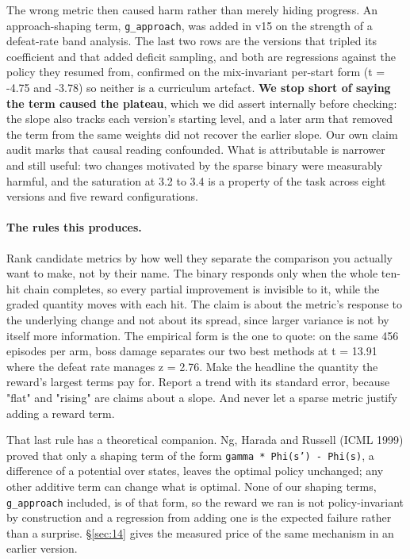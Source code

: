 \documentclass[11pt]{article}
\begin{document}
The wrong metric then caused harm rather than merely hiding progress. An approach-shaping term, \texttt{g\_approach}, was added in v15 on the strength of a defeat-rate band analysis. The last two rows are the versions that tripled its coefficient and that added deficit sampling, and both are regressions against the policy they resumed from, confirmed on the mix-invariant per-start form (t = -4.75 and -3.78) so neither is a curriculum artefact. \textbf{We stop short of saying the term caused the plateau}, which we did assert internally before checking: the slope also tracks each version's starting level, and a later arm that removed the term from the same weights did not recover the earlier slope. Our own claim audit marks that causal reading confounded. What is attributable is narrower and still useful: two changes motivated by the sparse binary were measurably harmful, and the saturation at 3.2 to 3.4 is a property of the task across eight versions and five reward configurations.

\paragraph{The rules this produces.} Rank candidate metrics by how well they separate the comparison you actually want to make, not by their name. The binary responds only when the whole ten-hit chain completes, so every partial improvement is invisible to it, while the graded quantity moves with each hit. The claim is about the metric's response to the underlying change and not about its spread, since larger variance is not by itself more information. The empirical form is the one to quote: on the same 456 episodes per arm, boss damage separates our two best methods at t = 13.91 where the defeat rate manages z = 2.76. Make the headline the quantity the reward's largest terms pay for. Report a trend with its standard error, because "flat" and "rising" are claims about a slope. And never let a sparse metric justify adding a reward term.

That last rule has a theoretical companion. Ng, Harada and Russell (ICML 1999) proved that only a shaping term of the form \texttt{gamma * Phi(s') - Phi(s)}, a difference of a potential over states, leaves the optimal policy unchanged; any other additive term can change what is optimal. None of our shaping terms, \texttt{g\_approach} included, is of that form, so the reward we ran is not policy-invariant by construction and a regression from adding one is the expected failure rather than a surprise. \S\ref{sec:14} gives the measured price of the same mechanism in an earlier version.
\end{document}
